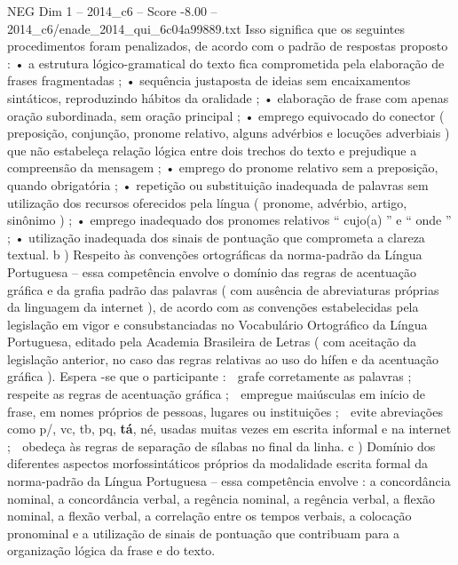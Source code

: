 \begin{textsample}{NEG Dim 1 – 2014\_c6 – Score -8.00 – 2014\_c6/enade\_2014\_qui\_6c04a99889.txt}
Isso significa que os seguintes procedimentos foram penalizados, de acordo com o padrão de respostas proposto : • a estrutura lógico-gramatical do texto fica comprometida pela elaboração de frases fragmentadas ; • sequência justaposta de ideias sem encaixamentos sintáticos, reproduzindo hábitos da oralidade ; • elaboração de frase com apenas oração subordinada, sem oração principal ; • emprego equivocado do conector ( preposição, conjunção, pronome relativo, alguns advérbios e locuções adverbiais ) que não estabeleça relação lógica entre dois trechos do texto e prejudique a compreensão da mensagem ; • emprego do pronome relativo sem a preposição, quando obrigatória ; • repetição ou substituição inadequada de palavras sem utilização dos recursos oferecidos pela língua ( pronome, advérbio, artigo, sinônimo ) ; • emprego inadequado dos pronomes relativos “ cujo(a) ” e “ onde ” ; • utilização inadequada dos sinais de pontuação que comprometa a clareza textual. b ) Respeito às convenções ortográficas da norma-padrão da Língua Portuguesa – essa competência envolve o domínio das regras de acentuação gráfica e da grafia padrão das palavras ( com ausência de abreviaturas próprias da linguagem da internet ), de acordo com as convenções estabelecidas pela legislação em vigor e consubstanciadas no Vocabulário Ortográfico da Língua Portuguesa, editado pela Academia Brasileira de Letras ( com aceitação da legislação anterior, no caso das regras relativas ao uso do hífen e da acentuação gráfica ).
Espera -se que o participante :  grafe corretamente as palavras ;  respeite as regras de acentuação gráfica ;  empregue maiúsculas em início de frase, em nomes próprios de pessoas, lugares ou instituições ;  evite abreviações como p/, vc, tb, pq, \textbf{tá}, né, usadas muitas vezes em escrita informal e na internet ;  obedeça às regras de separação de sílabas no final da linha. c ) Domínio dos diferentes aspectos morfossintáticos próprios da modalidade escrita formal da norma-padrão da Língua Portuguesa – essa competência envolve : a concordância nominal, a concordância verbal, a regência nominal, a regência verbal, a flexão nominal, a flexão verbal, a correlação entre os tempos verbais, a colocação pronominal e a utilização de sinais de pontuação que contribuam para a organização lógica da frase e do texto.

\end{textsample}
